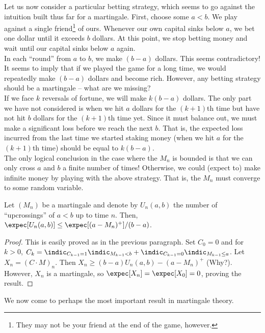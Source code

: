 		Let us now consider a particular betting strategy, which seems to go against the intuition built thus far for a martingale. First, choose some $a<b$. We play against a single friend\footnote{They may not be your friend at the end of the game, however.} of ours. Whenever our own capital sinks below $a$, we bet one dollar until it exceeds $b$ dollars. At this point, we stop betting money and wait until our capital sinks below $a$ again.\\
		In each ``round'' from $a$ to $b$, we make $(b-a)$ dollars. This seems contradictory! It seems to imply that if we played the game for a long time, we would repeatedly make $(b-a)$ dollars and become rich. However, any betting strategy should be a martingale -- what are we missing?\\
		If we face $k$ reversals of fortune, we will make $k(b-a)$ dollars. The only part we have not considered is when we hit $a$ dollars for the $(k+1)$th time but have not hit $b$ dollars for the $(k+1)$th time yet. Since it must balance out, we must make a significant loss before we reach the next $b$. That is, the expected loss incurred from the last time we started staking money (when we hit $a$ for the $(k+1)$th time) should be equal to $k(b-a)$.\\
		The only logical conclusion in the case where the $M_n$ is bounded is that we can only cross $a$ and $b$ a finite number of times! Otherwise, we could (expect to) make infinite money by playing with the above strategy. That is, the $M_n$ must converge to some random variable.

		\begin{lemma}
			\label{doob's upcrossing lemma}
			Let $(M_n)$ be a martingale and denote by $U_n(a,b)$ the number of ``upcrossings'' of $a<b$ up to time $n$. Then, $\expec[U_n(a,b)] \leq \expec[(a-M_n)^+]/(b-a)$.
		\end{lemma}
		\begin{proof}
			This is easily proved as in the previous paragraph. Set $C_0 = 0$ and for $k>0$, $C_k = \indic_{C_{k-1}=1}\indic_{M_{k-1} < b} + \indic_{C_{k-1}=0}\indic_{M_{k-1} \leq a}$. Let $X_n = (C\cdot M)_n$. Then $X_n \geq (b-a)U_n(a,b) - (a-M_n)^+$ (Why?). However, $X_n$ is a martingale, so $\expec[X_n] = \expec[X_0] = 0$, proving the result.
		\end{proof}

		We now come to perhaps the most important result in martingale theory.

